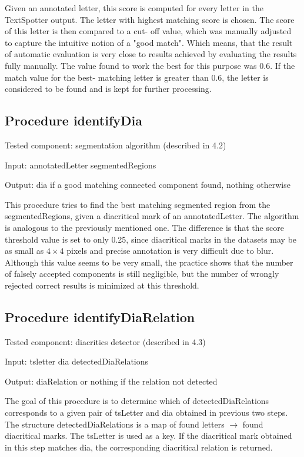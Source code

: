 \documentclass[12pt,a4paper]{report}
\begin{document}
Given an annotated letter, this score is computed for every letter in the TextSpotter output. The letter with highest matching score is chosen. The score of this letter is then compared to a cut- off value, which was manually adjusted to capture the intuitive notion of a "good match". Which means, that the result of automatic evaluation is very close to results achieved by evaluating the results fully manually. The value found to work the best for this purpose was 0.6. If the match value for the best- matching letter is greater than 0.6, the letter is considered to be found and is kept for further processing.

\subsection{Procedure identifyDia}
Tested component: segmentation algorithm (described in 4.2)

Input: annotatedLetter segmentedRegions

Output: dia if a good matching connected component found, nothing otherwise

This procedure tries to find the best matching segmented region from the segmentedRegions, given a diacritical mark of an annotatedLetter. The algorithm is analogous to the previously mentioned one. The difference is that the score threshold value is set to only 0.25, since diacritical marks in the datasets may be as small as $4 \times 4$ pixels and precise annotation is very difficult due to blur. Although this value seems to be very small, the practice shows that the number of falsely accepted components is still negligible, but the number of wrongly rejected correct results is minimized at this threshold.

\subsection{Procedure identifyDiaRelation}
Tested component: diacritics detector (described in 4.3)

Input: tsletter dia detectedDiaRelations

Output: diaRelation or nothing if the relation not detected

The goal of this procedure is to determine which of detectedDiaRelations corresponds to a given pair of tsLetter and dia obtained in previous two steps. The structure detectedDiaRelations is a map of found letters $\rightarrow$ found diacritical marks. The tsLetter is used as a key. If the diacritical mark obtained in this step matches dia, the corresponding diacritical relation is returned.
\end{document}
